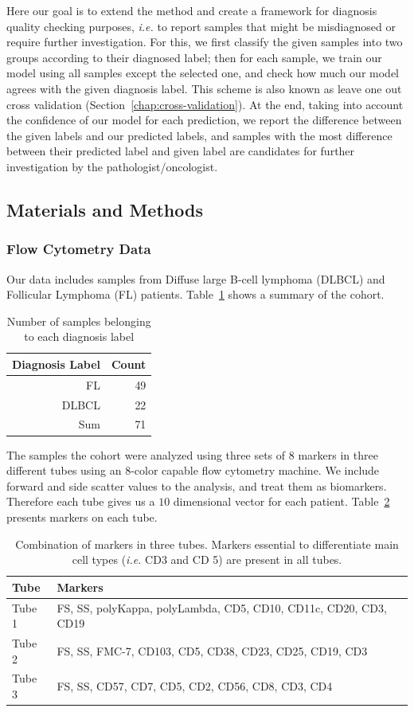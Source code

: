 Here our goal is to extend the method and create a framework for diagnosis quality checking purposes, \emph{i.e.} to report samples that might be misdiagnosed or require further investigation. For this, we first classify the given samples into two groups according to their diagnosed label; then for each sample, we train our model using all samples except the selected one, and check how much our model agrees with the given diagnosis label. This scheme is also known as leave one out cross validation (Section~\ref{chap:cross-validation}). At the end, taking into account the confidence of our model for each prediction, we report the difference between the given labels and our predicted labels, and samples with the most difference between their predicted label and given label are candidates for further investigation by the pathologist/oncologist.
\subsection{Materials and Methods}
\subsubsection{Flow Cytometry Data}
Our data includes samples from Diffuse large B-cell lymphoma (DLBCL) and Follicular Lymphoma (FL) patients. Table~\ref{tbl:fcs-qa-cohorts} shows a summary of the cohort.

\begin{table}[!ht]
  \centering
  \begin{tabular}{rr}
  	Diagnosis Label & Count \\ \hline
    FL & 49\\
    DLBCL & 22 \\ 
    Sum & 71
  \end{tabular}
  \caption{Number of samples belonging to each diagnosis label}
  \label{tbl:fcs-qa-cohorts}
\end{table}

The samples the cohort were analyzed using three sets of 8 markers in three different tubes using an 8-color capable flow cytometry machine. We include forward and side scatter values to the analysis, and treat them as biomarkers. Therefore each tube gives us a $10$ dimensional vector for each patient. Table~\ref{tbl:fcs-qa-markers} presents markers on each tube.

\begin{table}[!ht]
  \centering
  \begin{tabular}{lm{7cm}}
    Tube & Markers \\ \hline
    Tube 1 & FS, SS, polyKappa, polyLambda, CD5, CD10, CD11c, CD20, CD3, CD19 \\
    Tube 2 & FS, SS, FMC-7, CD103, CD5, CD38, CD23, CD25, CD19, CD3 \\
    Tube 3 & FS, SS, CD57, CD7, CD5, CD2, CD56, CD8, CD3, CD4 \\ \hline
  \end{tabular}
  \caption{Combination of markers in three tubes. Markers essential to differentiate main cell types (\emph{i.e.} CD3 and CD 5) are present in all tubes.}
  \label{tbl:fcs-qa-markers}
\end{table}


